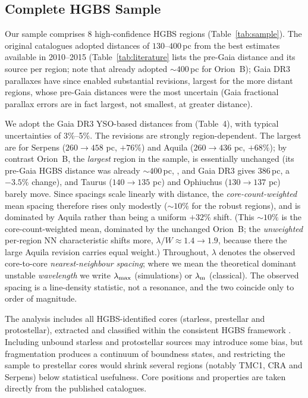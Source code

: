 \documentclass[usenatbib,twoside,twocolumn]{mnras}
\begin{document}
\subsection{Complete HGBS Sample}

Our sample comprises 8 high-confidence HGBS regions (Table~\ref{tab:sample}). The original catalogues \citep{Konyves2015, Konyves2020, Ladjelate2020, Pezzuto2021} adopted distances of $130$--$400$\,pc from the best estimates available in 2010--2015 (Table~\ref{tab:literature} lists the pre-Gaia distance and its source per region; note that \citealt{Konyves2020} already adopted $\sim400$\,pc for Orion~B); Gaia DR3 parallaxes \citep{Zhang2023} have since enabled substantial revisions, largest for the more distant regions, whose pre-Gaia distances were the most uncertain (Gaia fractional parallax errors are in fact largest, not smallest, at greater distance).

We adopt the Gaia DR3 YSO-based distances from \citet{Zhang2023} (Table~4), with typical uncertainties of 3\%--5\%. The revisions are strongly region-dependent. The largest are for Serpens ($260 \to 458$ pc, $+76\%$) and Aquila ($260 \to 436$ pc, $+68\%$); by contrast Orion~B, the \emph{largest} region in the sample, is essentially unchanged (its pre-Gaia HGBS distance was already $\sim400$\,pc, \citealt{Konyves2020}, and Gaia DR3 gives $386$\,pc, a $-3.5\%$ change), and Taurus ($140 \to 135$ pc) and Ophiuchus ($130 \to 137$ pc) barely move. Since spacings scale linearly with distance, the \emph{core-count-weighted} mean spacing therefore rises only modestly ($\sim10\%$ for the robust regions), and is dominated by Aquila rather than being a uniform $+32\%$ shift. (This $\sim10\%$ is the core-count-weighted mean, dominated by the unchanged Orion~B; the \emph{unweighted} per-region NN characteristic shifts more, $\lambda/W\approx1.4\to1.9$, because there the large Aquila revision carries equal weight.) Throughout, $\lambda$ denotes the observed core-to-core \emph{nearest-neighbour spacing}; where we mean the theoretical dominant unstable \emph{wavelength} we write $\lambda_{\rm max}$ (simulations) or $\lambda_{\rm m}$ (classical). The observed spacing is a line-density statistic, not a resonance, and the two coincide only to order of magnitude.

The analysis includes all HGBS-identified cores (starless, prestellar and protostellar), extracted and classified within the consistent HGBS framework \citep{Konyves2015, Konyves2020}. Including unbound starless and protostellar sources may introduce some bias, but fragmentation produces a continuum of boundness states, and restricting the sample to prestellar cores would shrink several regions (notably TMC1, CRA and Serpens) below statistical usefulness. Core positions and properties are taken directly from the published catalogues.
\end{document}
